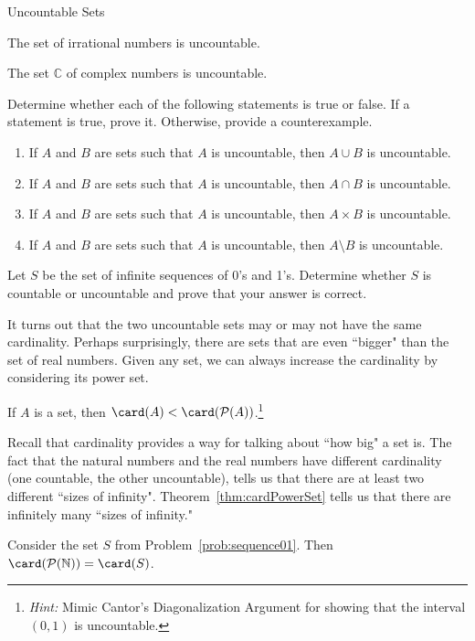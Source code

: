 \begin{section}{Uncountable Sets}
\begin{theorem}
The set of irrational numbers is uncountable.
\end{theorem}

\begin{theorem}
The set $\mathbb{C}$ of complex numbers is uncountable.
\end{theorem}

\begin{problem}
Determine whether each of the following statements is true or false. If a statement is true, prove it.  Otherwise, provide a counterexample.
\begin{enumerate}[label=\textrm{(\alph*)}]
\item If $A$ and $B$ are sets such that $A$ is uncountable, then $A\cup B$ is uncountable.
\item If $A$ and $B$ are sets such that $A$ is uncountable, then $A\cap B$ is uncountable.
\item If $A$ and $B$ are sets such that $A$ is uncountable, then $A\times B$ is uncountable.
\item If $A$ and $B$ are sets such that $A$ is uncountable, then $A\setminus B$ is uncountable.
\end{enumerate}
\end{problem}

\begin{problem}\label{prob:sequence01} 
Let $S$ be the set of infinite sequences of 0's and 1's. Determine whether $S$ is countable or uncountable and prove that your answer is correct. 
\end{problem}

It turns out that the two uncountable sets may or may not have the same cardinality.  Perhaps surprisingly, there are sets that are even ``bigger" than the set of real numbers. Given any set, we can always increase the cardinality by considering its power set.

\begin{theorem}\label{thm:cardPowerSet}
If $A$ is a set, then $\card(A)<\card(\mathcal{P}(A))$.\footnote{\emph{Hint:} Mimic Cantor's Diagonalization Argument for showing that the interval $(0,1)$ is uncountable.}
\end{theorem}

Recall that cardinality provides a way for talking about ``how big" a set is. The fact that the natural numbers and the real numbers have different cardinality (one countable, the other uncountable), tells us that there are at least two different ``sizes of infinity".  Theorem~\ref{thm:cardPowerSet} tells us that there are infinitely many ``sizes of infinity."

\begin{theorem}
Consider the set $S$ from Problem~\ref{prob:sequence01}. Then $\card(\mathcal{P}(\mathbb{N}))=\card(S)$.
\end{theorem}

\end{section}